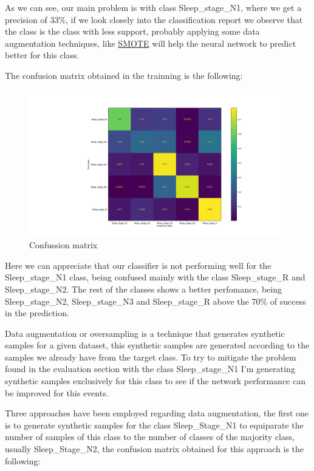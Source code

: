 As we can see, our main problem is with class Sleep\_stage\_N1, where we get a precision of 33\%, if we look closely into the classification report we observe that the class is the class with less support, probably applying some data augmentation techniques, like \href{https://imbalanced-learn.org/stable/references/generated/imblearn.over_sampling.SMOTE.html}{SMOTE} will help the neural network to predict better for this class.

The confusion matrix obtained in the trainning is the following:

\begin{figure}[H]
\hspace*{-4cm}\includegraphics[scale=.5]{figs/cm.png}
\caption{Confussion matrix}
\label{fig4}
\end{figure}

Here we can appreciate that our classifier is not performing well for the Sleep\_stage\_N1 class, being confused mainly with the class Sleep\_stage\_R and Sleep\_stage\_N2. The rest of the classes shows a better perfomance, being Sleep\_stage\_N2, Sleep\_stage\_N3 and Sleep\_stage\_R above the 70\% of success in the prediction.

Data augmentation or oversampling is a technique that generates synthetic samples for a given dataset, this synthetic samples are generated according to the samples we already have from the target class. To try to mitigate the problem found in the evaluation section with the class Sleep\_stage\_N1 I'm generating synthetic samples exclusively for this class to see if the network performance can be improved for this events.

Three approaches have been employed regarding data augmentation, the first one is to generate synthetic samples for the class Sleep\_Stage\_N1 to equiparate the number of samples of this class to the number of classes of the majority class, usually Sleep\_Stage\_N2, the confusion matrix obtained for this approach is the following:

